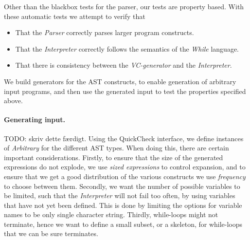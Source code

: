 Other than the blackbox tests for the parser, our tests are property based.
With these automatic tests we attempt to verify that
\begin{itemize}
	\item That the \textit{Parser} correctly parses larger program constructs.
	\item That the \textit{Interpreter} correctly follows the semantics of the \textit{While} language.
	\item That there is consistency between the \textit{VC-generator} and the \textit{Interpreter}.
\end{itemize}
We build generators for the AST constructs, to enable generation of arbitrary input programs, and then use the generated input to test the properties specified above.

\paragraph{Generating input.}
TODO: skriv dette færdigt.
Using the QuickCheck interface, we define instances of \textit{Arbitrary} for the different AST types.
When doing this, there are certain important considerations.
Firstly, to ensure that the size of the generated expressions do not explode, we use \textit{sized expressions} to control expansion, and to ensure that we get a good distribution of the various constructs we use \textit{frequency} to choose between them.
Secondly, we want the number of possible variables to be limited, such that the \textit{Interpreter} will not fail too often, by using variables that have not yet been defined. This is done by limiting the options for variable names to be only single character string.
Thirdly, while-loops might not terminate, hence we want to define a small subset, or a skeleton, for while-loops that we can be sure terminates. 

